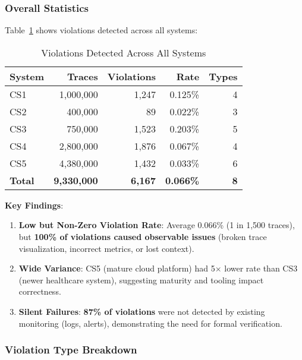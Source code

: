 \subsubsection{Overall Statistics}

Table~\ref{tab:violations} shows violations detected across all systems:

\begin{table}[t]
\caption{Violations Detected Across All Systems}
\label{tab:violations}
\small
\begin{tabular}{lrrrr}
\toprule
\textbf{System} & \textbf{Traces} & \textbf{Violations} & \textbf{Rate} & \textbf{Types} \\
\midrule
CS1 & 1,000,000 & 1,247 & 0.125\% & 4 \\
CS2 & 400,000 & 89 & 0.022\% & 3 \\
CS3 & 750,000 & 1,523 & 0.203\% & 5 \\
CS4 & 2,800,000 & 1,876 & 0.067\% & 4 \\
CS5 & 4,380,000 & 1,432 & 0.033\% & 6 \\
\midrule
\textbf{Total} & \textbf{9,330,000} & \textbf{6,167} & \textbf{0.066\%} & \textbf{8} \\
\bottomrule
\end{tabular}
\vspace{-0.1in}
\end{table}

\textbf{Key Findings}:

\begin{enumerate}
\item \textbf{Low but Non-Zero Violation Rate}: Average 0.066\% (1 in 1,500 traces), but \textbf{100\% of violations caused observable issues} (broken trace visualization, incorrect metrics, or lost context).

\item \textbf{Wide Variance}: CS5 (mature cloud platform) had 5$\times$ lower rate than CS3 (newer healthcare system), suggesting maturity and tooling impact correctness.

\item \textbf{Silent Failures}: \textbf{87\% of violations} were not detected by existing monitoring (logs, alerts), demonstrating the need for formal verification.
\end{enumerate}

\subsubsection{Violation Type Breakdown}

